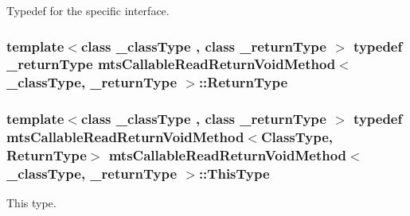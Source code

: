 Typedef for the specific interface. \hypertarget{classmts_callable_read_return_void_method_a7a7034303bbcaa112a28d75dd0a576d2}{
\subsubsection[{Return\-Type}]{\setlength{\rightskip}{0pt plus 5cm}template$<$class \-\_\-class\-Type , class \-\_\-return\-Type $>$ typedef \-\_\-return\-Type {\bf mts\-Callable\-Read\-Return\-Void\-Method}$<$ \-\_\-class\-Type, \-\_\-return\-Type $>$\-::{\bf Return\-Type}}}\label{classmts_callable_read_return_void_method_a7a7034303bbcaa112a28d75dd0a576d2}
\hypertarget{classmts_callable_read_return_void_method_a118254e466e472246199228424a10737}{
\subsubsection[{This\-Type}]{\setlength{\rightskip}{0pt plus 5cm}template$<$class \-\_\-class\-Type , class \-\_\-return\-Type $>$ typedef {\bf mts\-Callable\-Read\-Return\-Void\-Method}$<${\bf Class\-Type}, {\bf Return\-Type}$>$ {\bf mts\-Callable\-Read\-Return\-Void\-Method}$<$ \-\_\-class\-Type, \-\_\-return\-Type $>$\-::{\bf This\-Type}}}\label{classmts_callable_read_return_void_method_a118254e466e472246199228424a10737}
This type. 

